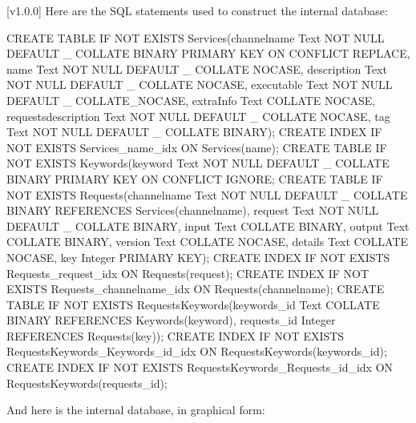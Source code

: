 [v1.0.0]
Here are the SQL statements used to construct the internal database:
\outputBegin
\begin{listing}[5]{1}
CREATE TABLE IF NOT EXISTS Services(channelname Text NOT NULL DEFAULT _
           COLLATE BINARY PRIMARY KEY ON CONFLICT REPLACE,
       name Text NOT NULL DEFAULT _ COLLATE NOCASE,
       description Text NOT NULL DEFAULT _ COLLATE NOCASE,
       executable Text NOT NULL DEFAULT _ COLLATE_NOCASE,
       extraInfo Text COLLATE NOCASE,
       requestsdescription Text NOT NULL DEFAULT _ COLLATE NOCASE,
       tag Text NOT NULL DEFAULT _  COLLATE BINARY);
CREATE INDEX IF NOT EXISTS Services_name_idx ON Services(name);
CREATE TABLE IF NOT EXISTS Keywords(keyword Text NOT NULL DEFAULT _
           COLLATE BINARY PRIMARY KEY ON CONFLICT IGNORE;
CREATE TABLE IF NOT EXISTS Requests(channelname Text NOT NULL DEFAULT _
           COLLATE BINARY REFERENCES Services(channelname),
       request Text NOT NULL DEFAULT _ COLLATE BINARY,
       input Text COLLATE BINARY,
       output Text COLLATE BINARY,
       version Text COLLATE NOCASE,
       details Text COLLATE NOCASE,
       key Integer PRIMARY KEY);
CREATE INDEX IF NOT EXISTS Requests_request_idx ON Requests(request);
CREATE INDEX IF NOT EXISTS Requests_channelname_idx ON Requests(channelname);
CREATE TABLE IF NOT EXISTS RequestsKeywords(keywords_id Text COLLATE BINARY
           REFERENCES Keywords(keyword),
       requests_id Integer REFERENCES Requests(key));
CREATE INDEX IF NOT EXISTS RequestsKeywords_Keywords_id_idx ON
       RequestsKeywords(keywords_id);
CREATE INDEX IF NOT EXISTS RequestsKeywords_Requests_id_idx ON
       RequestsKeywords(requests_id);
\end{listing}
\outputEnd
\condPage{}
And here is the internal database, in graphical form:\\
\appendixEnd{}
